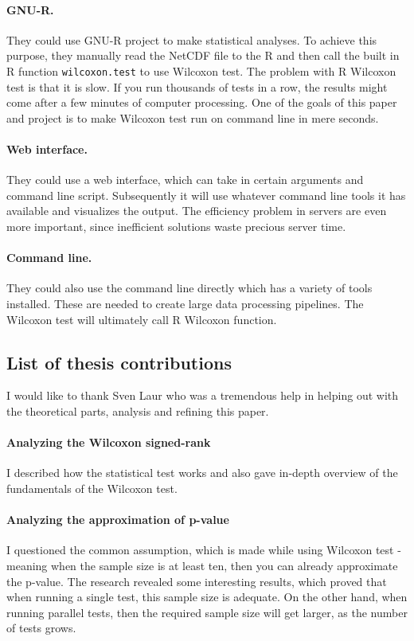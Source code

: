\documentclass[12pt]{article}
\begin{document}
{\paragraph{GNU-R.}
They could use GNU-R project to make statistical analyses. To achieve this purpose, they manually read the NetCDF file to the R and then call the built in R function \texttt{wilcoxon.test} to use Wilcoxon test. The problem with R Wilcoxon test is that it is slow. If you run thousands of tests in a row, the results might come after a few minutes of computer processing. One of the goals of this paper and project is to make Wilcoxon test run on command line in mere seconds.
\paragraph{Web interface.}
They could use a web interface, which can take in certain arguments and command line script. Subsequently it will use whatever command line tools it has available and visualizes the output. The efficiency problem in servers are even more important, since inefficient solutions waste precious server time.

\paragraph{Command line.}
They could also use the command line directly which has a variety of tools installed. These are needed to create large data processing pipelines. The Wilcoxon test will ultimately call R Wilcoxon function.

\subsection{List of thesis contributions}

I would like to thank Sven Laur who was a tremendous help in helping out with the theoretical parts, analysis and refining this paper.

\paragraph{Analyzing the Wilcoxon signed-rank\\}
I described how the statistical test works and also gave in-depth overview of the fundamentals of the Wilcoxon test.

\paragraph{Analyzing the approximation of p-value\\}
I questioned the common assumption, which is made while using Wilcoxon test - meaning when the sample size is at least ten, then you can already approximate the p-value. The research revealed some interesting results, which proved that when running a single test, this sample size is adequate. On the other hand, when running parallel tests, then the required sample size will get larger, as the number of tests grows.

}
\end{document}
